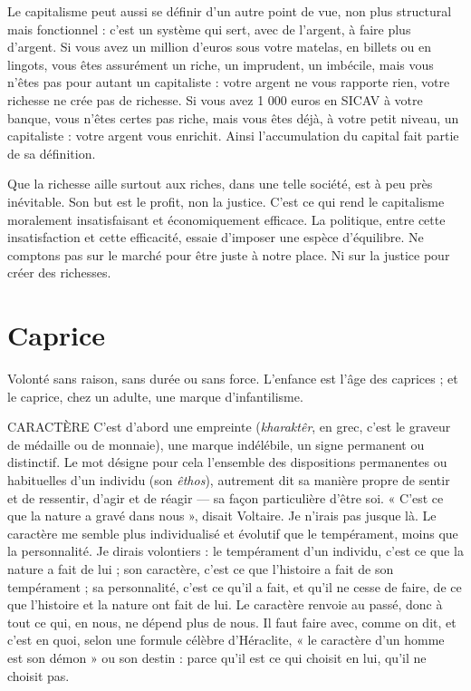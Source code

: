 Le capitalisme peut aussi se définir d’un autre point de vue, non plus structural
mais fonctionnel : c’est un système qui sert, avec de l'argent, à faire plus d’argent.
Si vous avez un million d’euros sous votre matelas, en billets ou en lingots, vous
êtes assurément un riche, un imprudent, un imbécile, mais vous n’êtes pas pour
autant un capitaliste : votre argent ne vous rapporte rien, votre richesse ne crée pas
de richesse. Si vous avez 1 000 euros en SICAV à votre banque, vous n'êtes certes
pas riche, mais vous êtes déjà, à votre petit niveau, un capitaliste : votre argent vous
enrichit. Ainsi l’accumulation du capital fait partie de sa définition.

Que la richesse aille surtout aux riches, dans une telle société, est à peu près
inévitable. Son but est le profit, non la justice. C’est ce qui rend le capitalisme
moralement insatisfaisant et économiquement efficace. La politique, entre cette
insatisfaction et cette efficacité, essaie d’imposer une espèce d'équilibre. Ne
comptons pas sur le marché pour être juste à notre place. Ni sur la justice pour
créer des richesses.

\section{Caprice}
Volonté sans raison, sans durée ou sans force. L'enfance est l’âge
des caprices ; et le caprice, chez un adulte, une marque d’infantilisme.

CARACTÈRE C’est d’abord une empreinte ({\it kharaktêr}, en grec, c’est le graveur
de médaille ou de monnaie), une marque indélébile, un
signe permanent ou distinctif. Le mot désigne pour cela l’ensemble des dispositions
permanentes ou habituelles d’un individu (son {\it êthos}), autrement
dit sa manière propre de sentir et de ressentir, d’agir et de réagir — sa façon
particulière d’être soi. « C’est ce que la nature a gravé dans nous », disait
Voltaire. Je n’irais pas jusque là. Le caractère me semble plus individualisé
et évolutif que le tempérament, moins que la personnalité. Je dirais
volontiers : le tempérament d’un individu, c’est ce que la nature a fait de
lui ; son caractère, c’est ce que l’histoire a fait de son tempérament ; sa personnalité,
c’est ce qu’il a fait, et qu’il ne cesse de faire, de ce que l’histoire et
la nature ont fait de lui. Le caractère renvoie au passé, donc à tout ce qui, en
nous, ne dépend plus de nous. Il faut faire avec, comme on dit, et c’est en
quoi, selon une formule célèbre d'Héraclite, « le caractère d’un homme est
son démon » ou son destin : parce qu’il est ce qui choisit en lui, qu’il ne
choisit pas.

